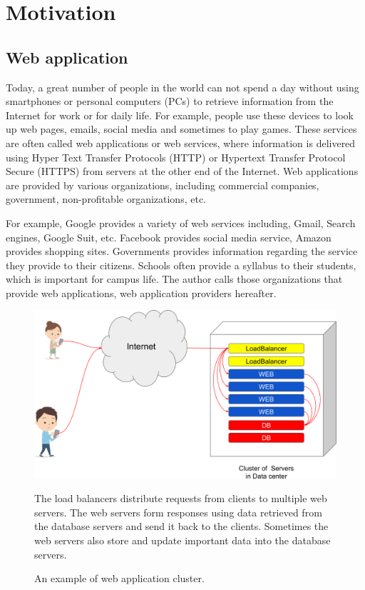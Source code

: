 
\section{Motivation}

\subsection{Web application}

Today, a great number of people in the world can not spend a day without using smartphones or personal computers (PCs) to retrieve information from the Internet for work or for daily life.
For example, people use these devices to look up web pages, emails, social media and sometimes to play games.
These services are often called web applications or web services, where information is delivered using Hyper Text Transfer Protocols (HTTP) or Hypertext Transfer Protocol Secure (HTTPS) from servers at the other end of the Internet.
Web applications are provided by various organizations, including commercial companies, government, non-profitable organizations, etc.

For example, Google provides a variety of web services including, Gmail, Search engines, Google Suit, etc.
Facebook provides social media service, Amazon provides shopping sites.
Governments provides information regarding the service they provide to their citizens.
Schools often provide a syllabus to their students, which is important for campus life.
The author calls those organizations that provide web applications, web application providers hereafter.

\begin{figure}[h]
\begin{center}
\includegraphics[width=0.8\columnwidth]{Figs/web_cluster.png}
\end{center}
\caption{
An example of web application cluster.
}
\centering\parbox[c]{0.9\columnwidth}{
The load balancers distribute requests from clients to multiple web servers.
The web servers form responses using data retrieved from the database servers and send it back to the clients.
Sometimes the web servers also store and update important data into the database servers.
}
\label{fig:web_cluster}
\end{figure}

